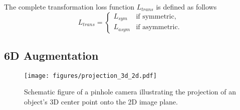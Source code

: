 \documentclass[twocolumn, 10pt, letterpaper]{article}
\begin{document}
The complete transformation loss function $L_{trans}$ is defined as follows
\begin{equation}
\label{equation_transformation_loss}
L_{trans} = 
\begin{cases}
L_{sym} & \text{if symmetric}, \\
L_{asym} & \text{if asymmetric}.
\end{cases}
\end{equation}

\subsection{6D Augmentation}
\label{subsection_6d_augmentation}

\begin{figure}[b]
\texttt{[image: figures/projection\_3d\_2d.pdf]}
\caption{Schematic figure of a pinhole camera illustrating the projection of an object's 3D center point onto the 2D image plane.}
\label{figure_camera_3d_2d_projection}
\end{figure}
\end{document}
